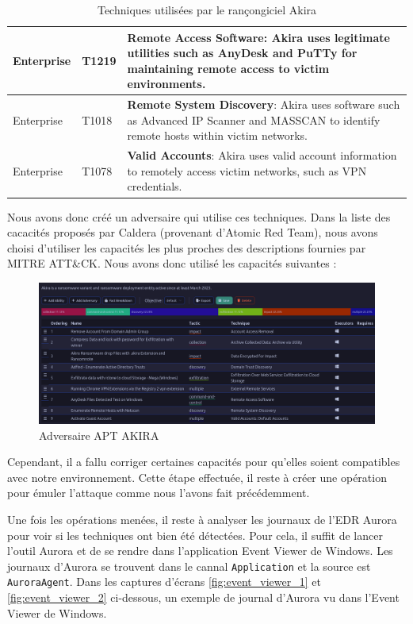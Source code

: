 \documentclass[12pt,letterpaper]{article}
\begin{document}
\begin{table}[h!]
\begin{tabular}{|l|l|p{10cm}|}
        Enterprise & T1219 & \textbf{Remote Access Software}: Akira uses legitimate utilities such as AnyDesk and PuTTy for maintaining remote access to victim environments. \\ \hline
        Enterprise & T1018 & \textbf{Remote System Discovery}: Akira uses software such as Advanced IP Scanner and MASSCAN to identify remote hosts within victim networks. \\ \hline
        Enterprise & T1078 & \textbf{Valid Accounts}: Akira uses valid account information to remotely access victim networks, such as VPN credentials. \\ \hline
    \end{tabular}
    \caption{Techniques utilisées par le rançongiciel Akira}
    \label{tab:akira_techniques}
\end{table}

Nous avons donc créé un adversaire qui utilise ces techniques.
Dans la liste des cacacités proposés par Caldera (provenant d'Atomic Red Team), nous avons choisi d'utiliser les capacités les plus proches des descriptions fournies par MITRE ATT\&CK.
Nous avons donc utilisé les capacités suivantes :

\begin{figure}[h!]
    \centering
    \includegraphics[width=1\textwidth]{images/caldera/akira_adversary.png}
    \caption{Adversaire APT AKIRA}
    \label{fig:akira_adversary}
\end{figure}

Cependant, il a fallu corriger certaines capacités pour qu'elles soient compatibles avec notre environnement. 
Cette étape effectuée, il reste à créer une opération pour émuler l'attaque comme nous l'avons fait précédemment.

\bigskip

Une fois les opérations menées, il reste à analyser les journaux de l'EDR Aurora pour voir si les techniques ont bien été détectées.
Pour cela, il suffit de lancer l'outil Aurora et de se rendre dans l'application Event Viewer de Windows.
Les journaux d'Aurora se trouvent dans le cannal \verb|Application| et la source est \verb|AuroraAgent|.
Dans les captures d'écrans \ref{fig:event_viewer_1} et \ref{fig:event_viewer_2} ci-dessous, un exemple de journal d'Aurora vu dans l'Event Viewer de Windows.
\end{document}
